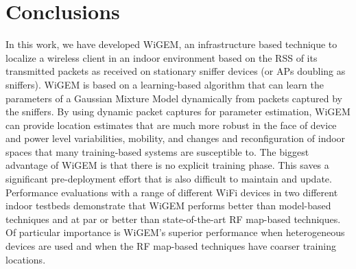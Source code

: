 \section{Conclusions}
\label{sec:conclusions}

In this work, we have developed WiGEM, an infrastructure based technique to localize a
wireless client in an indoor environment based on the RSS
 of its transmitted packets as received on stationary sniffer devices (or APs doubling 
as sniffers). WiGEM is based on a learning-based
algorithm that can learn the parameters of a Gaussian Mixture Model
dynamically from packets captured by the sniffers.
By using dynamic packet captures for parameter
estimation, WiGEM can provide location estimates 
that are much more robust in the face of device and power level
variabilities, mobility, and changes
and reconfiguration of indoor spaces that many training-based systems
are susceptible to. The biggest advantage of WiGEM is that there is no explicit 
training phase. This saves a significant pre-deployment effort that is also
difficult to maintain and update. Performance evaluations with 
a range of different WiFi devices in two different indoor testbeds demonstrate
that WiGEM performs better than model-based techniques and at par or better than 
state-of-the-art RF map-based techniques. Of particular importance is WiGEM's
superior performance when heterogeneous devices are used and when the RF map-based
techniques have coarser training locations. 


%
